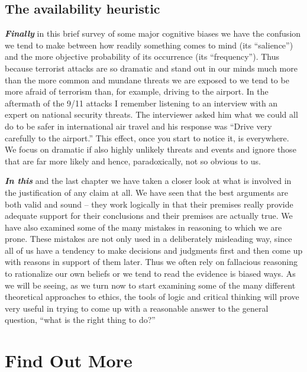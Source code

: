 \documentclass[]{book}
\begin{document}
\hypertarget{the-availability-heuristic}{%
\subsection*{The availability heuristic}\label{the-availability-heuristic}}


\textbf{\emph{Finally}} in this brief survey of some major cognitive biases we have the confusion we tend to make between how readily something comes to mind (its ``salience'') and the more objective probability of its occurrence (its ``frequency''). Thus because terrorist attacks are so dramatic and stand out in our minds much more than the more common and mundane threats we are exposed to we tend to be more afraid of terrorism than, for example, driving to the airport. In the aftermath of the 9/11 attacks I remember listening to an interview with an expert on national security threats. The interviewer asked him what we could all do to be safer in international air travel and his response was ``Drive very carefully to the airport.'' This effect, once you start to notice it, is everywhere. We focus on dramatic if also highly unlikely threats and events and ignore those that are far more likely and hence, paradoxically, not so obvious to us.

\textbf{\emph{In this}} and the last chapter we have taken a closer look at what is involved in the justification of any claim at all. We have seen that the best arguments are both valid and sound -- they work logically in that their premises really provide adequate support for their conclusions and their premises are actually true. We have also examined some of the many mistakes in reasoning to which we are prone. These mistakes are not only used in a deliberately misleading way, since all of us have a tendency to make decisions and judgments first and then come up with reasons in support of them later. Thus we often rely on fallacious reasoning to rationalize our own beliefs or we tend to read the evidence is biased ways. As we will be seeing, as we turn now to start examining some of the many different theoretical approaches to ethics, the tools of logic and critical thinking will prove very useful in trying to come up with a reasonable answer to the general question, ``what is the right thing to do?''

\hypertarget{find-out-more}{%
\section*{Find Out More}\label{find-out-more}}
\end{document}
